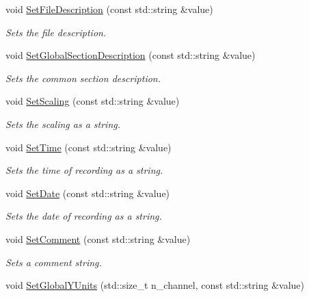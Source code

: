 \begin{DoxyCompactItemize}
void \hyperlink{classRecording_a193e0c1bd77cfa63fafcc53e7cf6c464}{SetFileDescription} (const std::string \&value)
\begin{DoxyCompactList}\small\item\em Sets the file description. \item\end{DoxyCompactList}\item 
void \hyperlink{classRecording_a91b87c66a1617c7c65b2e59cc90bf208}{SetGlobalSectionDescription} (const std::string \&value)
\begin{DoxyCompactList}\small\item\em Sets the common section description. \item\end{DoxyCompactList}\item 
void \hyperlink{classRecording_a57e8e850cdab5e8b7bc0ea1151167b57}{SetScaling} (const std::string \&value)
\begin{DoxyCompactList}\small\item\em Sets the scaling as a string. \item\end{DoxyCompactList}\item 
void \hyperlink{classRecording_a69bb7b1800a70d3a095c75174c2c7ea2}{SetTime} (const std::string \&value)
\begin{DoxyCompactList}\small\item\em Sets the time of recording as a string. \item\end{DoxyCompactList}\item 
void \hyperlink{classRecording_a8464f2041690ee87ebee6f9451305f4f}{SetDate} (const std::string \&value)
\begin{DoxyCompactList}\small\item\em Sets the date of recording as a string. \item\end{DoxyCompactList}\item 
void \hyperlink{classRecording_aaa1795e440158f311668add436efa5d7}{SetComment} (const std::string \&value)
\begin{DoxyCompactList}\small\item\em Sets a comment string. \item\end{DoxyCompactList}\item 
void \hyperlink{classRecording_a0f62de3e2012869fd47cae5d9310664b}{SetGlobalYUnits} (std::size\_\-t n\_\-channel, const std::string \&value)

\end{DoxyCompactItemize}

